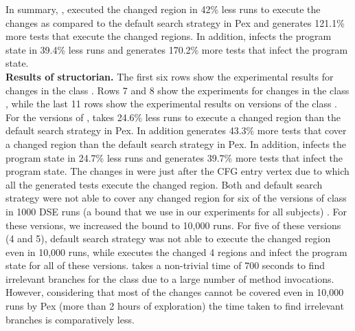 In summary, , executed the changed region in 42\% less runs to execute the changes as compared to the default search strategy in Pex and generates 121.1\% more tests that execute the changed regions. In addition,  infects the program state in 39.4\% less runs and generates 170.2\% more tests that infect the program state.
\\ \textbf{Results of structorian.} The first six rows show the experimental results for changes in the class . Rows 7 and 8 show the experiments for changes in the class , 
 while the last 11 rows show the experimental results on versions of the class . For the versions of ,  takes 24.6\% less runs to execute a changed region than the default search strategy in Pex. In addition  generates 43.3\% more tests that cover a changed region than the default search strategy in Pex. In addition,  infects the program state in 24.7\% less runs and generates 39.7\% more tests that infect the program state. The changes in  were just after the CFG entry vertex due to which all the generated tests execute the changed region.
 	Both  and default search strategy were not able to cover any changed region for six of the versions of class  in 1000 DSE runs (a bound that we use in our experiments for all subjects) . For these versions, we increased the bound to 10,000 runs. For five of these versions (4 and 5), default search strategy was not able to execute the changed region even in 10,000 runs, while  executes the changed 4 regions and infect the program state for all of these versions.  takes a non-trivial time of 700 seconds to find irrelevant branches for the class  due to a large number of method invocations. However, considering that most of the changes cannot be covered even in 10,000 runs by Pex (more than 2 hours of exploration) the time taken to find irrelevant branches is comparatively less.
